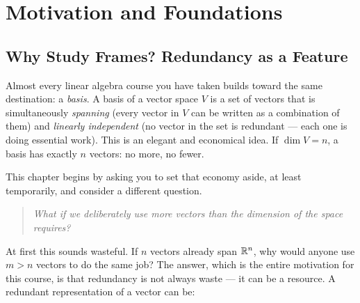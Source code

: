 \chapter{Motivation and Foundations}
\label{ch:motivation}
\section{Why Study Frames? Redundancy as a Feature}
\label{sec:why-frames}

Almost every linear algebra course you have taken builds toward the same destination: a \emph{basis}. A basis of a vector space $V$ is a set of vectors that is simultaneously \emph{spanning} (every vector in $V$ can be written as a combination of them) and \emph{linearly independent} (no vector in the set is redundant --- each one is doing essential work). This is an elegant and economical idea. If $\dim V = n$, a basis has exactly $n$ vectors: no more, no fewer.

This chapter begins by asking you to set that economy aside, at least temporarily, and consider a different question.

\begin{quote}
\itshape What if we deliberately use \emph{more} vectors than the dimension of the space requires?
\end{quote}

At first this sounds wasteful. If $n$ vectors already span $\mathbb{R}^n$, why would anyone use $m > n$ vectors to do the same job? The answer, which is the entire motivation for this course, is that redundancy is not always waste --- it can be a resource. A redundant representation of a vector can be:

